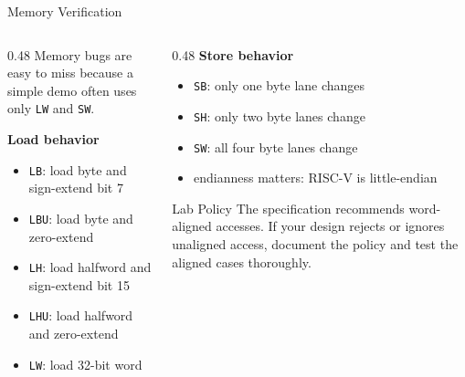 \documentclass[aspectratio=169,10pt]{beamer}
\begin{document}
\begin{frame}{Memory Verification}
  \begin{columns}[T]
    \begin{column}{0.48\textwidth}
      Memory bugs are easy to miss because a simple demo often uses only \texttt{LW} and \texttt{SW}.

      \vspace{0.7em}
      \textbf{Load behavior}
      \begin{itemize}
        \item \texttt{LB}: load byte and sign-extend bit 7
        \item \texttt{LBU}: load byte and zero-extend
        \item \texttt{LH}: load halfword and sign-extend bit 15
        \item \texttt{LHU}: load halfword and zero-extend
        \item \texttt{LW}: load 32-bit word
      \end{itemize}
    \end{column}
    \begin{column}{0.48\textwidth}
      \textbf{Store behavior}
      \begin{itemize}
        \item \texttt{SB}: only one byte lane changes
        \item \texttt{SH}: only two byte lanes change
        \item \texttt{SW}: all four byte lanes change
        \item endianness matters: RISC-V is little-endian
      \end{itemize}

      \vspace{0.7em}
      \begin{block}{Lab Policy}
        The specification recommends word-aligned accesses. If your design rejects or ignores unaligned access, document the policy and test the aligned cases thoroughly.
      \end{block}
    \end{column}
  \end{columns}
\end{frame}
\end{document}
